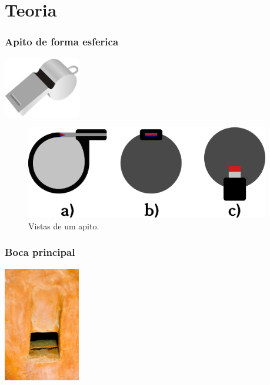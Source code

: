
\section{Teoria}


\begin{frame}
\frametitle{Apito de forma esferica}
\includegraphics[width=0.250\textwidth]{sections/teoria/football-referee-whistle.eps}
\begin{figure}[!h]
\vspace{-10pt}
  \centering
    \includegraphics[width=0.950\textwidth]{sections/teoria/apito-vistas.eps}
\caption{Vistas de um apito.}
\label{fig:dinamica-energia-ex1}
\end{figure}
\end{frame}

\begin{frame}
\frametitle{Boca principal}
 \includegraphics[width=0.250\textwidth]{sections/teoria/furo-principal.png}
\end{frame}
